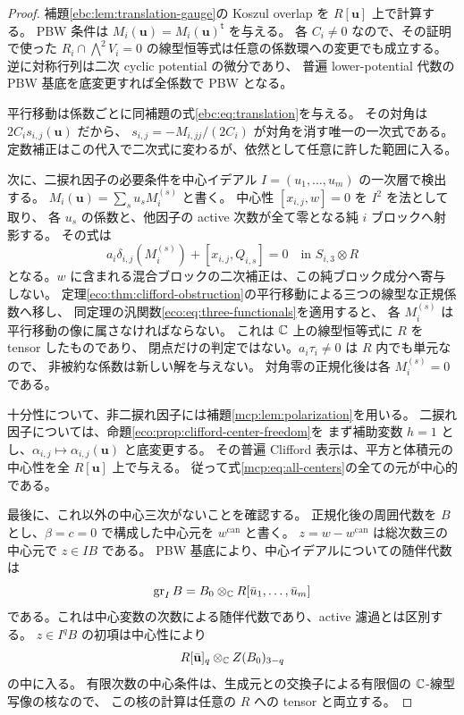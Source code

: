 \begin{proof}
補題\ref{ebc:lem:translation-gauge}の Koszul overlap を
$R[\mathbf u]$ 上で計算する。
PBW 条件は $M_i(\mathbf u)=M_i(\mathbf u)^{\mathsf t}$ を与える。
各 $C_i\ne0$ なので、その証明で使った
$R_i\cap\bigwedge^2V_i=0$ の線型恒等式は任意の係数環への変更でも成立する。
逆に対称行列は二次 cyclic potential の微分であり、
普遍 lower-potential 代数の PBW 基底を底変更すれば全係数で PBW となる。

平行移動は係数ごとに同補題の式\eqref{ebc:eq:translation}を与える。
その対角は $2C_i s_{i,j}(\mathbf u)$ だから、
$s_{i,j}=-M_{i,jj}/(2C_i)$ が対角を消す唯一の一次式である。
定数補正はこの代入で二次式に変わるが、依然として任意に許した範囲に入る。

次に、二捩れ因子の必要条件を中心イデアル $I=(u_1,\ldots,u_m)$ の一次層で検出する。
$M_i(\mathbf u)=\sum_s u_s M_i^{(s)}$ と書く。
中心性 $[x_{i,j},w]=0$ を $I^2$ を法として取り、
各 $u_s$ の係数と、他因子の active 次数が全て零となる純 $i$ ブロックへ射影する。
その式は
\[
       a_i\delta_{i,j}(M_i^{(s)})+[x_{i,j},Q_{i,s}]=0
                  \quad\text{in }S_{i,3}\otimes R
\]
となる。$w$ に含まれる混合ブロックの二次補正は、この純ブロック成分へ寄与しない。
定理\ref{eco:thm:clifford-obstruction}の平行移動による三つの線型な正規係数へ移し、
同定理の汎関数\eqref{eco:eq:three-functionals}を適用すると、
各 $M_i^{(s)}$ は平行移動の像に属さなければならない。
これは $\mathbb C$ 上の線型恒等式に $R$ を tensor したものであり、
閉点だけの判定ではない。$a_i\tau_i\ne0$ は $R$ 内でも単元なので、
非被約な係数は新しい解を与えない。
対角零の正規化後は各 $M_i^{(s)}=0$ である。

十分性について、非二捩れ因子には補題\ref{mcp:lem:polarization}を用いる。
二捩れ因子については、命題\ref{eco:prop:clifford-center-freedom}を
まず補助変数 $h=1$ とし、$\alpha_{i,j}\mapsto\alpha_{i,j}(\mathbf u)$ と底変更する。
その普遍 Clifford 表示は、平方と体積元の中心性を全 $R[\mathbf u]$ 上で与える。
従って式\eqref{mcp:eq:all-centers}の全ての元が中心的である。

最後に、これ以外の中心三次がないことを確認する。
正規化後の周囲代数を $B$ とし、$\beta=c=0$ で構成した中心元を $w^{\mathrm{can}}$ と書く。
$z=w-w^{\mathrm{can}}$ は総次数三の中心元で $z\in IB$ である。
PBW 基底により、中心イデアルについての随伴代数は
\begin{equation}\label{mcp:eq:i-associated}
       \operatorname{gr}_I B
             =B_0\otimes_{\mathbb C}R[\bar u_1,\ldots,\bar u_m]
\end{equation}
である。これは中心変数の次数による随伴代数であり、active 濾過とは区別する。
$z\in I^qB$ の初項は中心性により
\[
    R[\bar{\mathbf u}]_q\otimes_{\mathbb C}Z(B_0)_{3-q}
\]
の中に入る。
有限次数の中心条件は、生成元との交換子による有限個の $\mathbb C$-線型写像の核なので、
この核の計算は任意の $R$ への tensor と両立する。


\end{proof}
